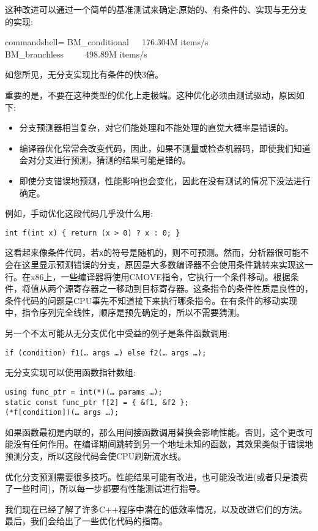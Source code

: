 这种改进可以通过一个简单的基准测试来确定:原始的、有条件的、实现与无分支的实现:

\begin{tcblisting}{commandshell={}}
BM_conditional   176.304M items/s
BM_branchless     498.89M items/s
\end{tcblisting}

如您所见，无分支实现比有条件的快3倍。

重要的是，不要在这种类型的优化上走极端。这种优化必须由测试驱动，原因如下:

\begin{itemize}
\item
分支预测器相当复杂，对它们能处理和不能处理的直觉大概率是错误的。

\item
编译器优化常常会改变代码，因此，如果不测量或检查机器码，即使我们知道会对分支进行预测，猜测的结果可能是错的。

\item
即使分支错误地预测，性能影响也会变化，因此在没有测试的情况下没法进行确定。
\end{itemize}

例如，手动优化这段代码几乎没什么用:

\begin{lstlisting}[style=styleCXX]
int f(int x) { return (x > 0) ? x : 0; }
\end{lstlisting}

这看起来像条件代码，若\texttt{x}的符号是随机的，则不可预测。然而，分析器很可能不会在这里显示预测错误的分支，原因是大多数编译器不会使用条件跳转来实现这一行。在x86上，一些编译器将使用CMOVE指令，它执行一个条件移动。根据条件，将值从两个源寄存器之一移动到目标寄存器。这条指令的条件性质是良性的，条件代码的问题是CPU事先不知道接下来执行哪条指令。在有条件的移动实现中，指令序列完全线性，顺序是预先确定的，所以不需要猜测。 

另一个不太可能从无分支优化中受益的例子是条件函数调用:

\begin{lstlisting}[style=styleCXX]
if (condition) f1(… args …) else f2(… args …);
\end{lstlisting}

无分支实现可以使用函数指针数组:

\begin{lstlisting}[style=styleCXX]
using func_ptr = int(*)(… params …);
static const func_ptr f[2] = { &f1, &f2 };
(*f[condition])(… args …);
\end{lstlisting}

如果函数最初是内联的，那么用间接函数调用替换会影响性能。否则，这个更改可能没有任何作用。在编译期间跳转到另一个地址未知的函数，其效果类似于错误地预测分支，所以这段代码会使CPU刷新流水线。 

优化分支预测需要很多技巧。性能结果可能有改进，也可能没改进(或者只是浪费了一些时间)，所以每一步都要有性能测试进行指导。

我们现在已经了解了许多C++程序中潜在的低效率情况，以及改进它们的方法。最后，我们会给出了一些优化代码的指南。



